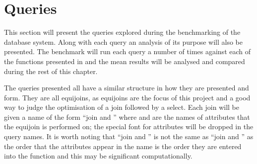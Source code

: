 \section{Queries}
This section will present the queries explored during the benchmarking of the
database system. Along with each query an analysis of its purpose will also be
presented. The benchmark will run each query a number of times against each of
the functions presented in  and the mean results
will be analysed and compared during the rest of this chapter.

The queries presented all have a similar structure in how they are presented and
form. They are all equijoins, as equijoins are the focus of this project and a
good way to judge the optimisation of a join followed by a select. Each join
will be given a name of the form ``join  and
'' where  and 
are the names of attributes that the equijoin is performed on; the special font
for attributes will be dropped in the query names. It is worth noting that
``join  and '' is not the same as
``join  and '' as the order that the
attributes appear in the name is the order they are entered into the function
and this may be significant computationally.
